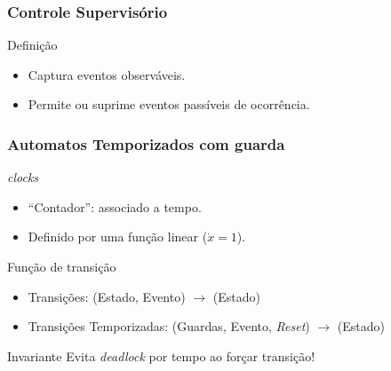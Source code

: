 \begin{frame}
	\frametitle{Controle Supervisório}
	\begin{block}{Definição}
		\begin{itemize}
		  \item Captura eventos observáveis.
		  \item Permite ou suprime eventos passíveis de ocorrência.
		\end{itemize}
	\end{block}
	
	\vspace{0.3cm}
	
\end{frame}

\begin{frame}	
	\frametitle{Automatos Temporizados com guarda}
	
	\begin{exampleblock}{\textit{clocks}}
		\begin{itemize}
		  \item ``Contador'': associado a tempo.
		  \item Definido por uma função linear ($\dot{x} = 1$).
		\end{itemize}
	\end{exampleblock}
	
	\begin{block}{Função de transição}
		\begin{itemize}
		  \item Transições: (Estado, Evento) $\rightarrow$ (Estado)
		  \item Transições Temporizadas: (Guardas, Evento, \textit{Reset})
		  $\rightarrow$ (Estado)
		\end{itemize}
	\end{block}
	
\end{frame}

\begin{frame}
	\vspace{-0.6cm}
	
	\pause
	\begin{exampleblock}{Invariante}
		Evita \textit{deadlock} por tempo ao forçar transição!
	\end{exampleblock}
\end{frame}

